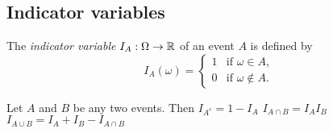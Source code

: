 


\subsection{Indicator variables}
\begin{definition}
The \emph{indicator variable} $I_A:\Omega\to\mathbb{R}$ of an event $A$ is defined by
\[
I_A(\omega) = 
	\left\{
	\begin{array}{ll}
	1 & \text{if } \omega\in A, \\
	0 & \text{if } \omega\notin A.
	\end{array}
	\right.
\]
\end{definition}

\begin{theorem}
Let $A$ and $B$ be any two events. Then
\ben
\it $I_{A^c} = 1 - I_A$
\it $I_{A\cap B} = I_A I_B$
\it $I_{A\cup B} = I_A + I_B - I_{A\cap B}$
\een
\end{theorem}

